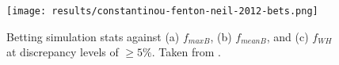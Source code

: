 \begin{figure}[H]
    \centering
    \texttt{[image: results/constantinou-fenton-neil-2012-bets.png]}
    \caption{Betting simulation stats against (a) $f_{maxB}$, (b) $f_{meanB}$, and (c) $f_{WH}$ at discrepancy levels of $\geq 5\%$. Taken from \citet{bib:constantinou-fenton-neil-2012}.}
    \label{fig:app-constantinou-fenton-neil-2012-bets}
\end{figure}